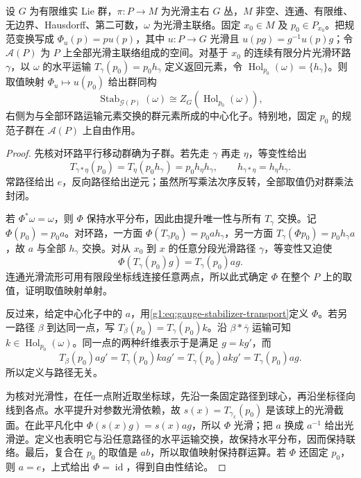 \begin{theorem}\label{g1:thm:gauge-stabilizer-centralizer}
	设 \(G\) 为有限维实 Lie 群，\(\pi:P\to M\) 为光滑主右 \(G\) 丛，\(M\) 非空、连通、有限维、无边界、Hausdorff、第二可数，\(\omega\) 为光滑主联络。固定 \(x_0\in M\) 及 \(p_0\in P_{x_0}\)。把规范变换写成 \(\Phi_u(p)=pu(p)\)，其中 \(u:P\to G\) 光滑且 \(u(pg)=g^{-1}u(p)g\)；令 \(\mathcal A(P)\) 为 \(P\) 上全部光滑主联络组成的空间。对基于 \(x_0\) 的连续有限分片光滑环路 \(\gamma\)，以 \(\omega\) 的水平运输 \(T_\gamma(p_0)=p_0h_\gamma\) 定义返回元素，令 \(\operatorname{Hol}_{p_0}(\omega)=\{h_\gamma\}\)。则取值映射 \(\Phi_u\mapsto u(p_0)\) 给出群同构
	\[
		\operatorname{Stab}_{\mathcal G(P)}(\omega)
		\cong Z_G(\operatorname{Hol}_{p_0}(\omega)),
	\]
	右侧为与全部环路运输元素交换的群元素所成的中心化子。特别地，固定 \(p_0\) 的规范子群在 \(\mathcal A(P)\) 上自由作用。
\end{theorem}
\begin{proof}
	先核对环路平行移动群确为子群。若先走 \(\gamma\) 再走 \(\eta\)，等变性给出
	\[
		T_{\gamma*\eta}(p_0)=T_\eta(p_0h_\gamma)
		=p_0h_\eta h_\gamma,
		\qquad h_{\gamma*\eta}=h_\eta h_\gamma.
	\]
	常路径给出 \(e\)，反向路径给出逆元；虽然所写乘法次序反转，全部取值仍对群乘法封闭。

	若 \(\Phi^*\omega=\omega\)，则 \(\Phi\) 保持水平分布，因此由提升唯一性与所有 \(T_\gamma\) 交换。记 \(\Phi(p_0)=p_0a\)。对环路，一方面 \(\Phi(T_\gamma p_0)=p_0a h_\gamma\)，另一方面 \(T_\gamma(\Phi p_0)=p_0h_\gamma a\)，故 \(a\) 与全部 \(h_\gamma\) 交换。对从 \(x_0\) 到 \(x\) 的任意分段光滑路径 \(\gamma\)，等变性又迫使
	\begin{equation}\label{g1:eq:gauge-stabilizer-transport}
		\Phi(T_\gamma(p_0)g)=T_\gamma(p_0)a g.
	\end{equation}
	连通光滑流形可用有限段坐标线连接任意两点，所以此式确定 \(\Phi\) 在整个 \(P\) 上的取值，证明取值映射单射。

	反过来，给定中心化子中的 \(a\)，用\eqref{g1:eq:gauge-stabilizer-transport}定义 \(\Phi\)。若另一路径 \(\beta\) 到达同一点，写 \(T_\beta(p_0)=T_\gamma(p_0)k\)。沿 \(\beta*\bar\gamma\) 运输可知 \(k\in\operatorname{Hol}_{p_0}(\omega)\)。同一点的两种纤维表示于是满足 \(g=kg'\)，而
	\[
		T_\beta(p_0)a g'=T_\gamma(p_0)ka g'
		=T_\gamma(p_0)a k g'=T_\gamma(p_0)a g.
	\]
	所以定义与路径无关。

	为核对光滑性，在任一点附近取坐标球，先沿一条固定路径到球心，再沿坐标径向线到各点。水平提升对参数光滑依赖，故 \(s(x)=T_{\gamma_x}(p_0)\) 是该球上的光滑截面。在此平凡化中 \(\Phi(s(x)g)=s(x)a g\)，所以 \(\Phi\) 光滑；把 \(a\) 换成 \(a^{-1}\) 给出光滑逆。定义也表明它与沿任意路径的水平运输交换，故保持水平分布，因而保持联络。最后，复合在 \(p_0\) 的取值是 \(ab\)，所以取值映射保持群运算。若 \(\Phi\) 还固定 \(p_0\)，则 \(a=e\)，上式给出 \(\Phi=\operatorname{id}\)，得到自由性结论。
\end{proof}

